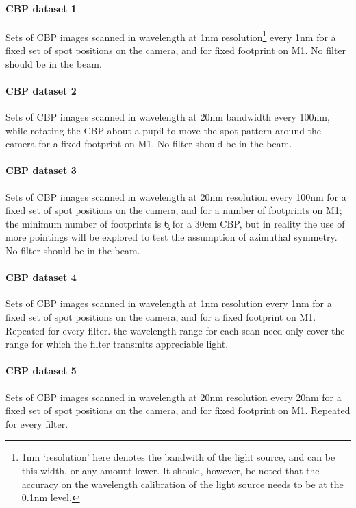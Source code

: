 \paragraph{CBP dataset 1}\label{sec:CPP:inputs:CBP:mono}
Sets of CBP images scanned in wavelength at 1nm resolution\footnote{1nm `resolution' here denotes the bandwith of the light source, and can be this width, or any amount lower. It should, however, be noted that the accuracy on the wavelength calibration of the light source needs to be at the 0.1nm level.} every 1nm for a fixed set of spot positions on the camera, and for fixed footprint on M1. No filter should be in the beam.


\paragraph{CBP dataset 2}\label{sec:CPP:inputs:CBP:spot}
Sets of CBP images scanned in wavelength at 20nm bandwidth every 100nm, while rotating the CBP about a pupil to move the spot pattern around the camera for a fixed footprint on M1. No filter should be in the beam.


\paragraph{CBP dataset 3}\label{sec:CPP:inputs:CBP:M1}
Sets of CBP images scanned in wavelength at 20nm resolution every 100nm for a fixed set of spot positions on the camera, and for a number of footprints on M1; the minimum number of footprints is \c 6 for a 30cm CBP, but in reality the use of more pointings will be explored to test the assumption of azimuthal symmetry. No filter should be in the beam.


\paragraph{CBP dataset 4}\label{sec:CPP:inputs:CBP:filter}
Sets of CBP images scanned in wavelength at 1nm resolution every 1nm for a fixed set of spot positions on the camera, and for a fixed footprint on M1. Repeated for every filter. \Nb the wavelength range for each scan need only cover the range for which the filter transmits appreciable light.


\paragraph{CBP dataset 5}\label{sec:CPP:inputs:CBP:leak}
Sets of CBP images scanned in wavelength at 20nm resolution every 20nm for a fixed set of spot positions on the camera, and for fixed footprint on M1. Repeated for every filter.


